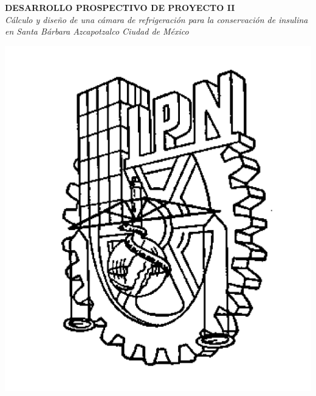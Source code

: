 \documentclass[11pt,a4paper]{article}
\begin{document}
	
	\vspace*{1cm}
	\begin{center}
		\begin{Large}
			\textbf{DESARROLLO PROSPECTIVO DE PROYECTO II}\\[0.2cm ]
			\textit{Cálculo y diseño de una cámara de refrigeración para la conservación de insulina en Santa Bárbara Azcapotzalco Ciudad de México}\\[0.4cm]
			
		\end{Large} 
	\end{center}
	\vspace*{1cm}
	\begin{center}
		\includegraphics[scale=0.62256022]{figures/ipnlines}\hspace{4cm} 
	\end{center}

	
	
\end{document}
